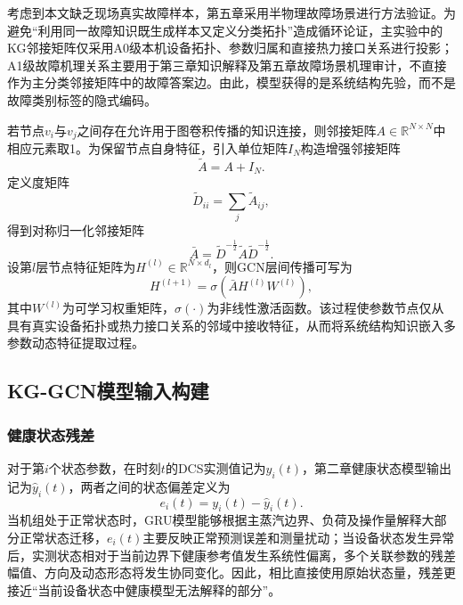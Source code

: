 考虑到本文缺乏现场真实故障样本，第五章采用半物理故障场景进行方法验证。为避免“利用同一故障知识既生成样本又定义分类拓扑”造成循环论证，主实验中的KG邻接矩阵仅采用A0级本机设备拓扑、参数归属和直接热力接口关系进行投影；A1级故障机理关系主要用于第三章知识解释及第五章故障场景机理审计，不直接作为主分类邻接矩阵中的故障答案边。由此，模型获得的是系统结构先验，而不是故障类别标签的隐式编码。

若节点$v_i$与$v_j$之间存在允许用于图卷积传播的知识连接，则邻接矩阵$A\in\mathbb R^{N\times N}$中相应元素取1。为保留节点自身特征，引入单位矩阵$I_N$构造增强邻接矩阵
\begin{equation}
    \tilde A=A+I_N.
\end{equation}
定义度矩阵
\begin{equation}
    \tilde D_{ii}=\sum_j\tilde A_{ij},
\end{equation}
得到对称归一化邻接矩阵
\begin{equation}
    \bar A=\tilde D^{-\frac{1}{2}}\tilde A\tilde D^{-\frac{1}{2}}.
\end{equation}
设第$l$层节点特征矩阵为$H^{(l)}\in\mathbb R^{N\times d_l}$，则GCN层间传播可写为
\begin{equation}
    H^{(l+1)}=\sigma\left(\bar A H^{(l)}W^{(l)}\right),
\end{equation}
其中$W^{(l)}$为可学习权重矩阵，$\sigma(\cdot)$为非线性激活函数。该过程使参数节点仅从具有真实设备拓扑或热力接口关系的邻域中接收特征，从而将系统结构知识嵌入多参数动态特征提取过程。

\subsection{KG-GCN模型输入构建}
\label{subsec:kg_gcn_input_v3}

\subsubsection{健康状态残差}

对于第$i$个状态参数，在时刻$t$的DCS实测值记为$y_i(t)$，第二章健康状态模型输出记为$\hat y_i(t)$，两者之间的状态偏差定义为
\begin{equation}
    e_i(t)=y_i(t)-\hat y_i(t).
\end{equation}
当机组处于正常状态时，GRU模型能够根据主蒸汽边界、负荷及操作量解释大部分正常状态迁移，$e_i(t)$主要反映正常预测误差和测量扰动；当设备状态发生异常后，实测状态相对于当前边界下健康参考值发生系统性偏离，多个关联参数的残差幅值、方向及动态形态将发生协同变化。因此，相比直接使用原始状态量，残差更接近“当前设备状态中健康模型无法解释的部分”。

